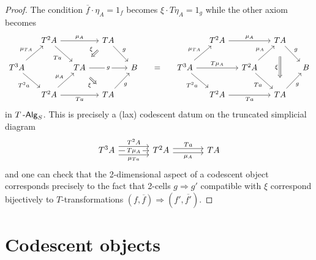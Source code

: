 \documentclass[a4paper,11pt,oneside,openany]{scrbook}
\begin{document}
\begin{proof}
    The condition $\overline{f}\cdot\eta_A=1_f$ becomes $\xi\cdot T\eta_A=1_g$
    while the other axiom becomes
    \[\begin{tikzcd}[column sep=small]
        & {T^2A} &&  TA &&&& {T^2A} && TA \\
        {T^3A} && TA && B & {=} & {T^3A} && {T^2A} && B \\
        & {T^2A} && TA &&&& {T^2A} && TA
        \arrow["Ta"', from=1-2, to=2-3]
        \arrow[""{name=0, anchor=center, inner sep=0}, "{\mu_A}", from=1-2, to=1-4]
        \arrow["g", from=1-4, to=2-5]
        \arrow["g"{description}, from=2-3, to=2-5]
        \arrow["g"', from=3-4, to=2-5]
        \arrow["Ta"', from=3-2, to=3-4]
        \arrow["{\mu_A}", from=3-2, to=2-3]
        \arrow["{T^2a}"', from=2-1, to=3-2]
        \arrow["{\mu_{TA}}", from=2-1, to=1-2]
        \arrow["\xi"', shorten <=8pt, shorten >=8pt, Rightarrow, from=1-4, to=2-3]
        \arrow["\xi"', shorten <=8pt, shorten >=8pt, Rightarrow, from=2-3, to=3-4]
        \arrow["g", from=1-10, to=2-11]
        \arrow["g"', from=3-10, to=2-11]
        \arrow["Ta"', from=2-9, to=3-10]
        \arrow["{\mu_A}", from=2-9, to=1-10]
        \arrow["\xi"', shorten <=13pt, shorten >=13pt, Rightarrow, from=1-10, to=3-10]
        \arrow["{\mu_A}", from=1-8, to=1-10]
        \arrow["{\mu_{TA}}", from=2-7, to=1-8]
        \arrow["{T^2a}"', from=2-7, to=3-8]
        \arrow["Ta"', from=3-8, to=3-10]
        \arrow["{T\mu_A}", from=2-7, to=2-9]
    \end{tikzcd}\]
    in $T\operatorname{-\mathsf{Alg}}_S$. This is precisely a (lax) codescent datum on the truncated
    simplicial diagram
    \[\begin{tikzcd}[column sep=large]
        {T^3A} & {T^2A} & TA
        \arrow["Ta", shift left=1, from=1-2, to=1-3]
        \arrow["{\mu_A}"', shift right=1, from=1-2, to=1-3]
        \arrow["{T\mu_A}"{description}, from=1-1, to=1-2]
        \arrow["{T^2A}", shift left=2, from=1-1, to=1-2]
        \arrow["{\mu_{Ta}}"', shift right=2, from=1-1, to=1-2]
    \end{tikzcd}\]
    and one can check that the 2-dimensional aspect of a codescent object
    corresponds precisely to the fact that 2-cells $g\Rightarrow g'$ compatible
    with $\xi$ correspond bijectively to $T$-transformations
    $(f,\overline{f})\Rightarrow(f',\overline{f'})$.
\end{proof}

\section{Codescent objects}
\end{document}
